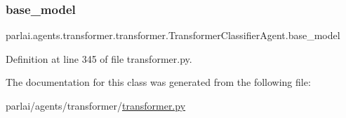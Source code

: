 \subsubsection{\texorpdfstring{base\+\_\+model}{base\_model}}
{\footnotesize\ttfamily parlai.\+agents.\+transformer.\+transformer.\+Transformer\+Classifier\+Agent.\+base\+\_\+model}



Definition at line 345 of file transformer.\+py.



The documentation for this class was generated from the following file\+:\begin{DoxyCompactItemize}
\item 
parlai/agents/transformer/\hyperlink{transformer_8py}{transformer.\+py}\end{DoxyCompactItemize}
